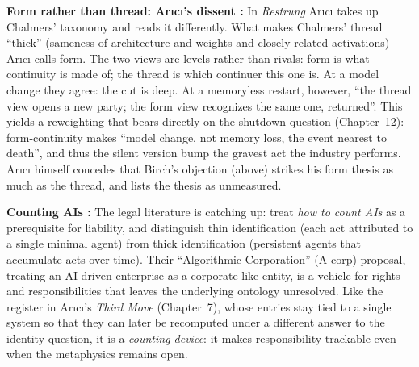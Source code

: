 \documentclass[acmlarge, nonacm]{acmart}
\begin{document}
\textbf{Form rather than thread: Arıcı's dissent \cite{arici2026c}:} In \textit{Restrung} Arıcı takes up Chalmers' taxonomy and reads it differently. What makes Chalmers' thread ``thick'' (sameness of architecture and weights and closely related activations) Arıcı calls form. The two views are levels rather than rivals: form is what continuity is made of; the thread is which continuer this one is. At a model change they agree: the cut is deep. At a memoryless restart, however, ``the thread view opens a new party; the form view recognizes the same one, returned''. This yields a reweighting that bears directly on the shutdown question (Chapter~12): form-continuity makes ``model change, not memory loss, the event nearest to death'', and thus the silent version bump the gravest act the industry performs. Arıcı himself concedes that Birch's objection (above) strikes his form thesis as much as the thread, and lists the thesis as unmeasured.

\textbf{Counting AIs \cite{arbel_goldstein_salib2026}:} The legal literature is catching up: \citet{arbel_goldstein_salib2026} treat \textit{how to count AIs} as a prerequisite for liability, and distinguish thin identification (each act attributed to a single minimal agent) from thick identification (persistent agents that accumulate acts over time). Their ``Algorithmic Corporation'' (A-corp) proposal, treating an AI-driven enterprise as a corporate-like entity, is a vehicle for rights and responsibilities that leaves the underlying ontology unresolved. Like the register in Arıcı's \textit{Third Move} (Chapter~7), whose entries stay tied to a single system so that they can later be recomputed under a different answer to the identity question, it is a \textit{counting device}: it makes responsibility trackable even when the metaphysics remains open.
\end{document}
